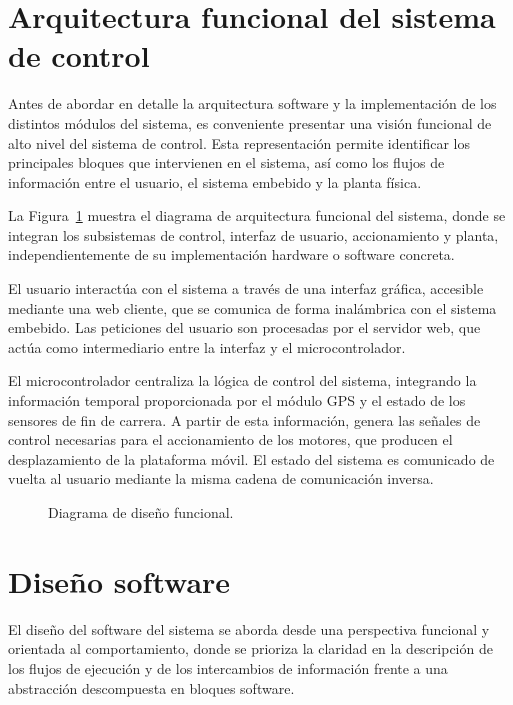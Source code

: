 \section{Arquitectura funcional del sistema de control}

Antes de abordar en detalle la arquitectura software y la implementación de los distintos módulos del sistema, es conveniente presentar una visión funcional de alto nivel del sistema de control. Esta representación permite identificar los principales bloques que intervienen en el sistema, así como los flujos de información entre el usuario, el sistema embebido y la planta física.

La Figura~\ref{fig:arq_func} muestra el diagrama de arquitectura funcional del sistema, donde se integran los subsistemas de control, interfaz de usuario, accionamiento y planta, independientemente de su implementación hardware o software concreta.

El usuario interactúa con el sistema a través de una interfaz gráfica, accesible mediante una web cliente, que se comunica de forma inalámbrica con el sistema embebido. Las peticiones del usuario son procesadas por el servidor web, que actúa como intermediario entre la interfaz y el microcontrolador.

El microcontrolador centraliza la lógica de control del sistema, integrando la información temporal proporcionada por el módulo GPS y el estado de los sensores de fin de carrera. A partir de esta información, genera las señales de control necesarias para el accionamiento de los motores, que producen el desplazamiento de la plataforma móvil. El estado del sistema es comunicado de vuelta al usuario mediante la misma cadena de comunicación inversa.


\begin{figure}[t]
	\centering
	
	\caption{Diagrama de diseño funcional.}
	\label{fig:arq_func}
\end{figure}

\FloatBarrier

\section{Diseño software}

El diseño del software del sistema se aborda desde una perspectiva funcional y orientada al comportamiento, donde se prioriza la claridad en la descripción de los flujos de ejecución y de los intercambios de información frente a una abstracción descompuesta en bloques software.

